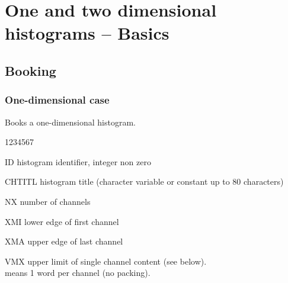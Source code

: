  
\chapter{One and two dimensional histograms -- Basics}
\label{HFUNDAMS}
\section{Booking}
\label{HBOOKING}
\subsection{One-dimensional case}


\Action Books a one-dimensional histogram.

\Idesc
\begin{DLtt}{1234567}
\item[ID] histogram identifier, integer non zero
\item[CHTITL] histogram title (character variable or constant up to 80
              characters)
\item[NX] number of channels
\item[XMI] lower edge of first channel
\item[XMA] upper edge of last channel
\item[VMX] upper limit of single channel content (see below).\\
            means 1 word per channel (no packing).
\end{DLtt}                                 

